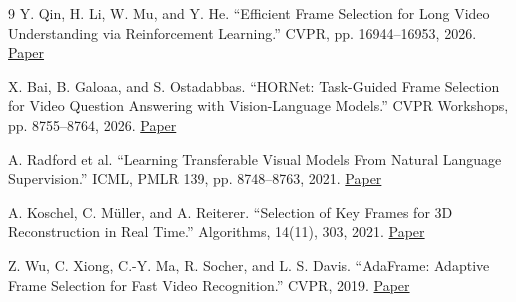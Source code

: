 \documentclass[
  11pt,
]{article}
\begin{document}
\begin{thebibliography}{9}
 Y. Qin, H. Li, W. Mu, and Y. He. ``Efficient Frame Selection for
Long Video Understanding via Reinforcement Learning.'' CVPR, pp.
16944--16953, 2026.
\href{https://openaccess.thecvf.com/content/CVPR2026/html/Qin_Efficient_Frame_Selection_for_Long_Video_Understanding_via_Reinforcement_Learning_CVPR_2026_paper.html}{Paper}

 X. Bai, B. Galoaa, and S. Ostadabbas. ``HORNet: Task-Guided
Frame Selection for Video Question Answering with Vision-Language
Models.'' CVPR Workshops, pp. 8755--8764, 2026.
\href{https://openaccess.thecvf.com/content/CVPR2026W/CV4Smalls/html/Bai_HORNet_Task-Guided_Frame_Selection_for_Video_Question_Answering_with_Vision-Language_CVPRW_2026_paper.html}{Paper}

 A. Radford et al. ``Learning Transferable Visual Models From
Natural Language Supervision.'' ICML, PMLR 139, pp. 8748--8763, 2021.
\href{https://proceedings.mlr.press/v139/radford21a.html}{Paper}

 A. Koschel, C. Müller, and A. Reiterer. ``Selection of Key
Frames for 3D Reconstruction in Real Time.'' Algorithms, 14(11), 303,
2021. \href{https://www.mdpi.com/1999-4893/14/11/303}{Paper}

 Z. Wu, C. Xiong, C.-Y. Ma, R. Socher, and L. S. Davis.
``AdaFrame: Adaptive Frame Selection for Fast Video Recognition.'' CVPR,
2019.
\href{https://openaccess.thecvf.com/content_CVPR_2019/html/Wu_AdaFrame_Adaptive_Frame_Selection_for_Fast_Video_Recognition_CVPR_2019_paper.html}{Paper}
\end{thebibliography}
\end{document}
